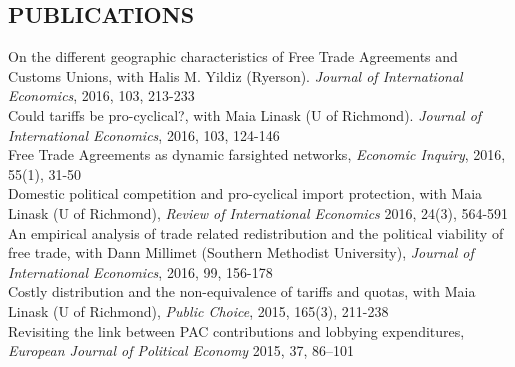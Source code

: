 \documentclass[11pt]{res}
\begin{document}
\begin{resume}
\section{PUBLICATIONS}\vspace{1.5mm}
{On the different geographic characteristics of Free Trade Agreements and Customs Unions}, with Halis M. Yildiz (Ryerson). \emph{Journal of International Economics}, 2016, 103, 213-233 \vspace{1.5mm}\\
{Could tariffs be pro-cyclical?}, with Maia Linask (U of Richmond). \emph{Journal of International Economics}, 2016, 103, 124-146 \vspace{1.5mm}\\
{ Free Trade Agreements as dynamic farsighted networks}, \emph{Economic Inquiry}, 2016, 55(1), 31-50\vspace{1.5mm}\\
{Domestic political competition and pro-cyclical import protection}, with Maia Linask (U of Richmond), \emph{Review of International Economics} 2016, 24(3), 564-591\vspace{1.5mm}\\
{An empirical analysis of trade related redistribution and the political viability of free trade}, with Dann Millimet (Southern Methodist University), \emph{Journal of International Economics}, 2016, 99, 156-178 \vspace{1.5mm}\\
{Costly distribution and the non-equivalence of tariffs and quotas}, with Maia Linask (U of Richmond), \emph{Public Choice}, 2015, 165(3), 211-238 \vspace{1.5mm}\\


\phantom{.}\vspace{0.5cm}
{Revisiting the link between PAC contributions and lobbying expenditures, \emph{European Journal of Political Economy}} 2015, 37, 86--101 \vspace{5mm}\\


\end{resume}
\end{document}
